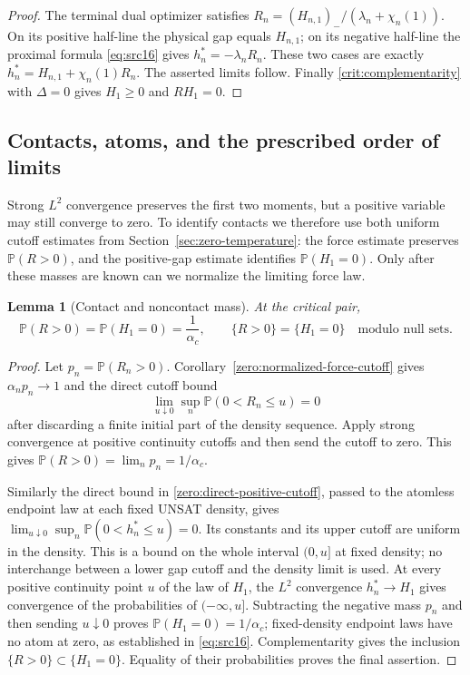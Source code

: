 \documentclass[11pt,a4paper]{article}
\numberwithin{equation}{section}
\newtheorem{lemma}[theorem]{Lemma}
\theoremstyle{definition}
\theoremstyle{remark}
\newcommand{\Prob}{\mathbb P}
\begin{document}
\begin{proof}
The terminal dual optimizer satisfies
$R_n=(H_{n,1})_-/(\lambda_n+\chi_n(1))$.  On its positive half-line
the physical gap equals $H_{n,1}$; on its negative half-line the
proximal formula \eqref{eq:src16} gives $h_n^*=-\lambda_nR_n$.
These two cases are exactly
$h_n^*=H_{n,1}+\chi_n(1)R_n$.  The asserted limits follow.
Finally \eqref{crit:complementarity} with $\Delta=0$ gives
$H_1\ge0$ and $RH_1=0$.
\end{proof}

\subsection{Contacts, atoms, and the prescribed order of limits}

Strong $L^2$ convergence preserves the first two moments, but a positive variable may still
converge to zero. To identify contacts we therefore use both uniform
cutoff estimates from Section~\ref{sec:zero-temperature}: the force
estimate preserves $\Prob(R>0)$, and the positive-gap estimate identifies
$\Prob(H_1=0)$. Only after these masses are known can we normalize the
limiting force law.

\begin{lemma}[Contact and noncontact mass]\label{crit:contacts}
At the critical pair,
\[
 \Prob(R>0)=\Prob(H_1=0)=\frac1{\alpha_c},
 \qquad \{R>0\}=\{H_1=0\}\quad\text{modulo null sets}.
\]
\end{lemma}

\begin{proof}
Let $p_n=\Prob(R_n>0)$. Corollary~\ref{zero:normalized-force-cutoff}
gives $\alpha_np_n\to1$ and the direct cutoff bound
\[
 \lim_{u\downarrow0}\sup_n\Prob(0<R_n\le u)=0
\]
after discarding a finite initial part of the density sequence.
Apply strong convergence at positive continuity cutoffs and then
send the cutoff to zero.  This gives
$\Prob(R>0)=\lim_np_n=1/\alpha_c$.

Similarly the direct bound in \eqref{zero:direct-positive-cutoff},
passed to the atomless endpoint law at each fixed UNSAT density, gives
$\lim_{u\downarrow0}\sup_n\Prob(0<h_n^*\le u)=0$.
Its constants and its upper cutoff are uniform in the density.
This is a bound on the whole interval $(0,u]$ at fixed density;
no interchange between a lower gap cutoff and the density limit is used.
At every positive continuity point $u$ of the law of $H_1$,
the $L^2$ convergence $h_n^*\to H_1$ gives convergence of the
probabilities of $(-\infty,u]$.  Subtracting the negative mass
$p_n$ and then sending $u\downarrow0$ proves
$\Prob(H_1=0)=1/\alpha_c$; fixed-density endpoint laws have no atom
at zero, as established in \eqref{eq:src16}.
Complementarity gives the inclusion $\{R>0\}\subset\{H_1=0\}$.
Equality of their probabilities proves the final assertion.
\end{proof}
\end{document}

